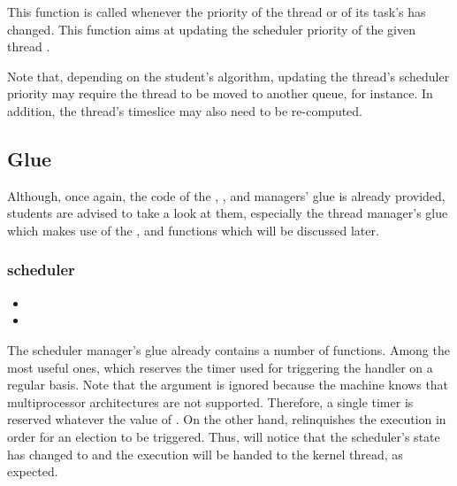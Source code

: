          {
           This function is called whenever the priority of the thread
           or of its task's has changed. This function aims at updating
           the scheduler priority of the given thread .

           \-

           Note that, depending on the student's algorithm, updating the
           thread's scheduler priority may require the thread to be moved
           to another queue, for instance. In addition, the thread's
           timeslice may also need to be re-computed.
         }

%
%

\subsection{Glue}

Although, once again, the code of the , , and
 managers' glue is already provided, students are advised
to take a look at them, especially the thread manager's glue which makes
use of the ,  and
 functions which will be discussed later.

\subsubsection*{scheduler}

\begin{itemize}
  \item
  \item
\end{itemize}

The scheduler manager's glue already contains a number of functions. Among
the most useful ones,  which reserves the
timer used for triggering the  handler on
a regular basis. Note that the  argument is ignored because
the machine knows that multiprocessor architectures are not supported.
Therefore, a single timer is reserved whatever the value of .
On the other hand,  relinquishes the execution
in order for an election to be triggered. Thus, 
will notice that the scheduler's state has changed to 
and the execution will be handed to the kernel thread, as expected.


